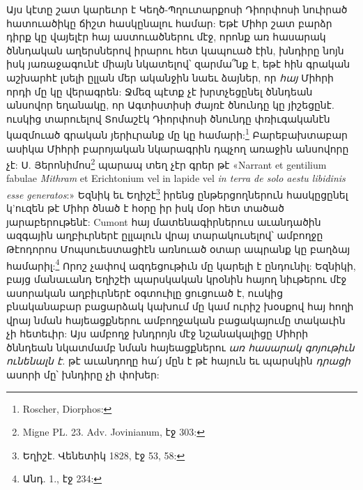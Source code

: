 \documentclass{article}
\begin{document}
{Այս կէտը շատ կարեւոր է Կեղծ-Պղուտարքոսի Դիորփոսի նուիրած հատուածիկը ճիշտ հասկընալու համար: Եթէ Միհր շատ բարձր դիրք կը վայելէր հայ աստուածներու մէջ, որոնք առ հասարակ ծննդական աղերսներով իրարու հետ կապուած էին, խնդիրը նոյն իսկ յառաջագունէ միայն նկատելով՝ զարմա՞նք է, եթէ հին գրական աշխարհէ լսելի ըլլան մեր ականջին նաեւ ձայներ, որ \emph{հայ} Միհրի որդի մը կը վերագրեն: Ջմեզ պէտք չէ խրտչեցընել ծննդեան անսովոր եղանակը, որ Ագտիստիսի ժայռէ ծնունդը կը յիշեցընէ. ուսկից տարուելով Տոմաշէկ Դիորփոսի ծնունդը փռիւգականէն կազմուած գրական յերիւրանք մը կը համարի:\footnote{Roscher, Diorphos:} Բարեբախտաբար ասիկա Միհրի բարոյական նկարագրին դպչող առաջին անսովորը չէ: Ս. Յերոնիմոս\footnote{Migne PL. 23. Adv. Jovinianum, էջ 303:} պարապ տեղ չէր գրեր թէ «Narrant et gentilium fabulae \emph{Mithram} et Erichtonium vel in lapide vel \emph{in terra de solo aestu libidinis esse generatos}:» Եզնիկ եւ Եղիշէ\footnote{Եղիշէ. Վենետիկ 1828, էջ 53, 58:} իրենց ընթերցողներուն հասկըցընել կ'ուզեն թէ Միհր ծնած է հօրը իր իսկ մօր հետ տածած յարաբերութենէ: Cumont հայ մատենագիրներուս աւանդածին ազգային աղբիւրներէ ըլլալուն վրայ տարակուսելով՝ ամբողջը Թէոդորոս Մոպսուեստացիէն առնուած օտար ապրանք կը բաղձայ համարիլ:\footnote{Անդ. 1., էջ 234:} Որոշ չափով ազդեցութիւն մը կարելի է ընդունիլ: Եզնիկի, բայց մանաւանդ Եղիշէի պարսկական կրօնին հայող նիւթերու մէջ ասորական աղբիւրներէ օգտուիլը ցուցուած է, ուսկից բնականաբար բացարձակ կախում մը կամ ուրիշ խօսքով հայ հողի վրայ նման հայեացքներու ամբողջական բացակայումը տակաւին չի հետեւիր: Այս ամբողջ խնդրոյն մէջ նշանակալիցը Միհրի ծննդեան նկատմամբ նման հայեացքներու \emph{առ հասարակ գոյութիւն ունենալն է.} թէ աւանդողը հա՛յ մըն է թէ հայուն եւ պարսկին \emph{դրացի} ասորի մը՝ խնդիրը չի փոխեր:

}
\end{document}

